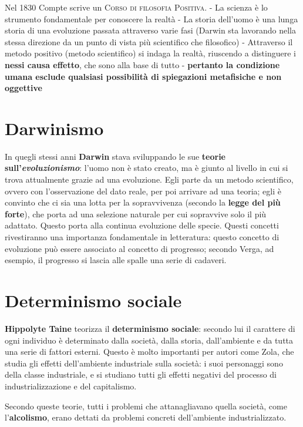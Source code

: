 \documentclass{book}
\newcommand{\evidenziatore}[1]{\textbf{#1}}
\begin{document}
Nel 1830 Compte scrive un \textsc{Corso di filosofia Positiva}. - La
scienza è lo strumento fondamentale per conoscere la realtà - La storia
dell'uomo è una lunga storia di una evoluzione passata attraverso varie
fasi (Darwin sta lavorando nella stessa direzione da un punto di vista
più scientifico che filosofico) - Attraverso il metodo positivo (metodo
scientifico) si indaga la realtà, riuscendo a distinguere i
\textbf{nessi causa effetto}, che sono alla base di tutto -
\evidenziatore{pertanto la condizione umana esclude qualsiasi possibilità di spiegazioni metafisiche e non oggettive}

\section{Darwinismo}

In quegli stessi anni \textbf{Darwin} stava sviluppando le sue
\evidenziatore{teorie sull’\textit{evoluzionismo}}: l'uomo non è stato creato,
ma è giunto al livello in cui si trova attualmente grazie ad una
evoluzione. Egli parte da un metodo scientifico, ovvero con
l'osservazione del dato reale, per poi arrivare ad una teoria; egli è
convinto che ci sia una lotta per la sopravvivenza (secondo la
\textbf{legge del più forte}), che porta ad una selezione naturale per
cui sopravvive solo il più adattato. Questo porta alla continua
evoluzione delle specie. Questi concetti rivestiranno una importanza
fondamentale in letteratura: questo concetto di evoluzione può essere
associato al concetto di progresso; secondo Verga, ad esempio, il
progresso si lascia alle spalle una serie di cadaveri.

\section{Determinismo sociale}

\textbf{Hippolyte Taine} teorizza il
\evidenziatore{determinismo sociale}: secondo lui il carattere di ogni
individuo è determinato dalla società, dalla storia, dall'ambiente e da
tutta una serie di fattori esterni. Questo è molto importanti per autori
come Zola, che studia gli effetti dell'ambiente industriale sulla
società: i suoi personaggi sono della classe industriale, e si studiano
tutti gli effetti negativi del processo di industrializzazione e del
capitalismo.

Secondo queste teorie, tutti i problemi che attanagliavano quella
società, come l'\textbf{alcolismo}, erano dettati da problemi concreti
dell'ambiente industrializzato.
\end{document}

